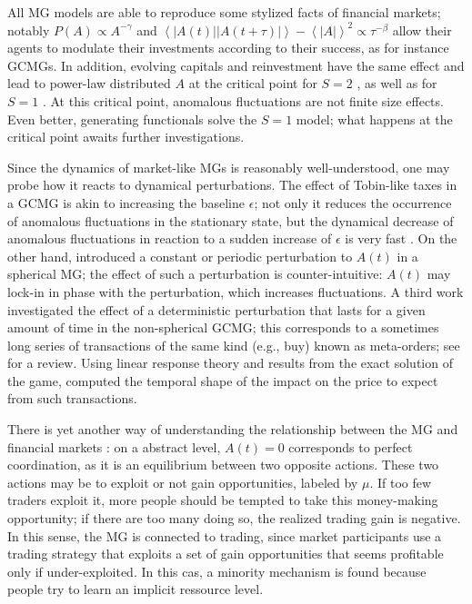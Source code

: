 \documentclass[aps,twocolumn,nofootinbib,sortedaddress,reprint]{revtex4-1}
\begin{document}
All MG models are able to reproduce some stylized facts of financial
markets; notably $P(A)\propto A^{-\gamma}$ and
$\left<|A(t)||A(t+\tau)|\right>-\left<|A|\right>^ 2\propto \tau^
{-\beta}$ allow their agents to modulate their investments
according to their success, as for instance GCMGs. In addition, evolving capitals and reinvestment have the
same effect and lead to power-law distributed $A$ at the critical
point for $S=2$ \cite{CCMZ00}, as well as for $S=1$
\cite{galla2009minority}. At this critical point, anomalous fluctuations are not finite size
effects. Even better, generating functionals solve the $S=1$ model; what
happens at the critical point awaits further investigations.

Since the dynamics of market-like MGs is reasonably well-understood, one
may probe how it reacts to dynamical perturbations. The effect of
Tobin-like taxes in a GCMG is akin to increasing the baseline
$\epsilon$; not only it reduces the occurrence of anomalous
fluctuations in the stationary state, but the dynamical decrease of
anomalous fluctuations in reaction to a sudden increase of $\epsilon$
is very fast \cite{bianconi2009tobin}. On the other hand,
\textcite{papadopoulos2008market} introduced a constant or periodic
perturbation to $A(t)$ in a spherical MG; the effect of such a
perturbation is counter-intuitive:  $A(t)$ may lock-in in
phase with the perturbation, which increases fluctuations.  A third
work investigated the effect of a deterministic perturbation that lasts for
a given amount of time in the non-spherical GCMG; this corresponds
to a sometimes long series of transactions of the same kind (e.g., buy) known as
meta-orders; see \textcite{BouchaudFarmerLillo} for a review. Using
linear response theory and results from the exact solution of the
game, \textcite{barato2011impact} computed the temporal shape of the
impact on the price to expect from such transactions.

There is yet another way of understanding the relationship between the
MG and financial markets \cite{C05}: on a abstract level, $A(t)=0$ corresponds to
perfect coordination, as it is an equilibrium between two opposite
actions. These two actions may be to exploit or not  gain
opportunities, labeled by $\mu$. If too few
traders exploit it, more people should be tempted to take this
money-making opportunity; if there are too many doing so, the realized trading
gain is negative. In this sense, the MG is connected to trading, since market
participants use a trading strategy that exploits a set of gain opportunities that seems profitable only if under-exploited. In this cas, a minority mechanism is found because people try to learn an implicit ressource level.
\end{document}
